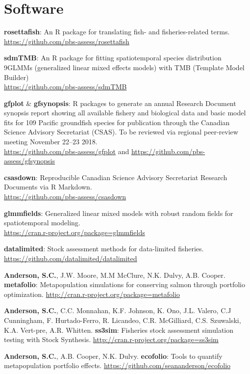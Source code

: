 \hypertarget{software}{%
\section{Software}\label{software}}

\begin{description}
\tightlist
\item[2019]
\textbf{rosettafish}: An R package for translating fish- and
fisheries-related terms.\\
\url{https://github.com/pbs-assess/rosettafish}
\item[2019]
\textbf{sdmTMB}: An R package for fitting spatiotemporal species
distribution 9GLMMs (generalized linear mixed effects models) with TMB
(Template Model Builder)\\
\url{https://github.com/pbs-assess/sdmTMB}
\item[2019]
\textbf{gfplot} \& \textbf{gfsynopsis}: R packages to generate an annual
Research Document synopsis report showing all available fishery and
biological data and basic model fits for 109 Pacific groundfish species
for publication through the Canadian Science Advisory Secretariat
(CSAS). To be reviewed via regional peer-review meeting November 22--23
2018.\\
\url{https://github.com/pbs-assess/gfplot} and
\url{https://github.com/pbs-assess/gfsynopsis}
\item[2019]
\textbf{csasdown}: Reproducible Canadian Science Advisory Secretariat
Research Documents via R Markdown.\\
\url{https://github.com/pbs-assess/csasdown}
\item[2018]
\textbf{glmmfields}: Generalized linear mixed models with robust random
fields for spatiotemporal modeling.\\
\url{https://cran.r-project.org/package=glmmfields}
\item[2017]
\textbf{datalimited}: Stock assessment methods for data-limited
fisheries. \url{https://github.com/datalimited/datalimited}
\item[2014]
\textbf{Anderson, S.C.}, J.W. Moore, M.M McClure, N.K. Dulvy, A.B.
Cooper.\\
\textbf{metafolio}: Metapopulation simulations for conserving salmon
through portfolio optimization.
\url{http://cran.r-project.org/package=metafolio}
\item[2013]
\textbf{Anderson, S.C.}, C.C. Monnahan, K.F. Johnson, K. Ono, J.L.
Valero, C.J Cunningham, F. Hurtado-Ferro, R. Licandeo, C.R. McGilliard,
C.S. Szuwalski, K.A. Vert-pre, A.R. Whitten. \textbf{ss3sim}: Fisheries
stock assessment simulation testing with Stock Synthesis.
\url{http://cran.r-project.org/package=ss3sim}
\item[2013]
\textbf{Anderson, S.C.}, A.B. Cooper, N.K. Dulvy. \textbf{ecofolio}:
Tools to quantify metapopulation portfolio effects.
\url{https://github.com/seananderson/ecofolio}
\end{description}

